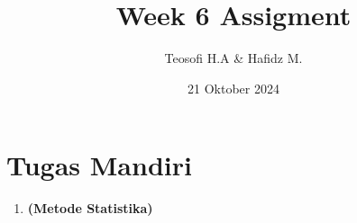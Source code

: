 \documentclass{article}
\title{\textbf{Week 6 Assigment}}
\date{21 Oktober 2024}
\author{Teosofi H.A \& Hafidz M.}
\begin{document}
    \maketitle

    \section*{Tugas Mandiri}
    \begin{enumerate}[label=\textbf{\arabic*.}]
        \item \textbf{(Metode Statistika)}\\
    \end{enumerate}
\end{document}
